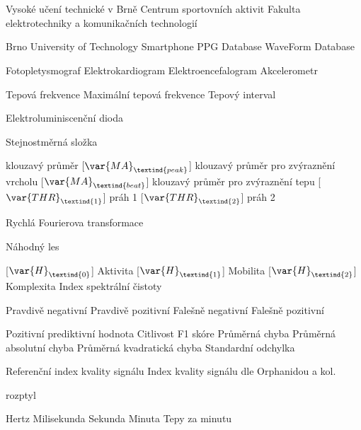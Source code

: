 \cleardoublepage
\chapter*{\listofabbrevname}
{}

\begin{acronym}[KolikMista]	%

			{Vysoké učení technické v Brně}
			{Centrum sportovních aktivit}
			{Fakulta elektrotechniky a komunikačních technologií}

		{Brno University of Technology Smartphone PPG Database}
			{WaveForm Database}

			{Fotopletysmograf}
			{Elektrokardiogram}
			{Elektroencefalogram}
			{Akcelerometr}

			{Tepová frekvence}
			{Maximální tepová frekvence}
			{Tepový interval}

			{Elektroluminiscenční dioda}

			{Stejnostměrná složka}

			{klouzavý průměr}
		[\ensuremath{\var{MA}_\textind{peak}}]
			{klouzavý průměr pro zvýraznění vrcholu}
		[\ensuremath{\var{MA}_\textind{beat}}]
		{klouzavý průměr pro zvýraznění tepu}
		[\ensuremath{\var{THR}_\textind{1}}]
		{práh 1}
		[\ensuremath{\var{THR}_\textind{2}}]
		{práh 2}
	
			{Rychlá Fourierova transformace}


			{Náhodný les}

		[\ensuremath{\var{H}_\textind{0}}]
		{Aktivita}
		[\ensuremath{\var{H}_\textind{1}}]
		{Mobilita}
		[\ensuremath{\var{H}_\textind{2}}]
		{Komplexita}
			{Index spektrální čistoty}

			{Pravdivě negativní}
			{Pravdivě pozitivní}
			{Falešně negativní}
			{Falešně pozitivní}

			{Pozitivní prediktivní hodnota}
			{Citlivost}
			{F1 skóre}
			{Průměrná chyba}
			{Průměrná absolutní chyba}
			{Průměrná kvadratická chyba}
			{Standardní odchylka}

		{Referenční index kvality signálu}
		{Index kvality signálu dle Orphanidou a kol.}

			{rozptyl}

			{Hertz}
			{Milisekunda}
			{Sekunda}
			{Minuta}
			{Tepy za minutu}


\end{acronym}
